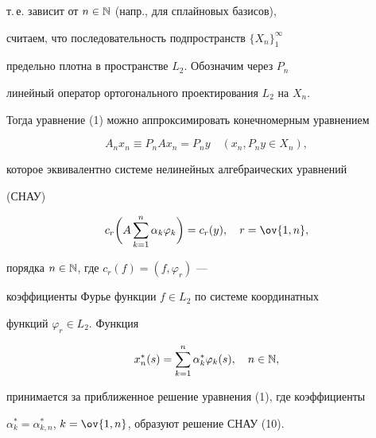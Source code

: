 т.\,е. зависит от $n\in \Bbb N$ (напр., для сплайновых базисов),


считаем, что последовательность подпространств $\{ X_n\}_1^\infty$ 


предельно плотна в пространстве $L_2$. Обозначим через $P_n$ 


линейный оператор ортогонального проектирования $L_2$ на $X_n$.


Тогда уравнение (1) можно аппроксимировать конечномерным уравнением


\begin{equation}


A_n x_n\equiv P_nAx_n=P_ny\quad (x_n, P_n y\in X_n),


\end{equation}


которое эквивалентно системе нелинейных алгебраических уравнений


(СНАУ)


\begin{equation}


c_r\bigg(A\sum_{k=1}^n\alpha_k \varphi_k\bigg)=c_r(y),\quad r=\ov{1,n},


\end{equation}


порядка $n\in \Bbb N$, где $c_r(f)=(f,\varphi_r)$ ---


коэффициенты Фурье функции $f\in L_2$ по системе координатных


функций $\varphi_r\in L_2$. Функция


\begin{equation}


x_n^*(s)=\sum_{k=1}^n\alpha_k^* \varphi_k(s),\quad n\in \Bbb N,


\end{equation}


принимается за приближенное решение уравнения (1), где коэффициенты


$\alpha_k^*=\alpha_{k,n}^*$, $k=\ov{1,n}$, образуют решение СНАУ (10).





